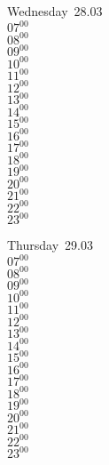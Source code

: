 \documentclass[11pt, a4paper]{book}\usepackage[]{graphicx}\usepackage[]{color}
\begin{document}
\begin{weekdaybox}
  Wednesday~28.03\\
  { 
  \vfill
  $07^{00}$\\
$08^{00}$\\
$09^{00}$\\
$10^{00}$\\
$11^{00}$\\
$12^{00}$\\
$13^{00}$\\
$14^{00}$\\
$15^{00}$\\
$16^{00}$\\
$17^{00}$\\
$18^{00}$\\
$19^{00}$\\
$20^{00}$\\
$21^{00}$\\
$22^{00}$\\
$23^{00}$\\
  }
\end{weekdaybox}
\clearpage
\begin{headerbox}
\end{headerbox}
\begin{weekdaybox}
  Thursday~29.03\\
  { 
  \vfill
  $07^{00}$\\
$08^{00}$\\
$09^{00}$\\
$10^{00}$\\
$11^{00}$\\
$12^{00}$\\
$13^{00}$\\
$14^{00}$\\
$15^{00}$\\
$16^{00}$\\
$17^{00}$\\
$18^{00}$\\
$19^{00}$\\
$20^{00}$\\
$21^{00}$\\
$22^{00}$\\
$23^{00}$\\
  }
\end{weekdaybox} 
\end{document}
